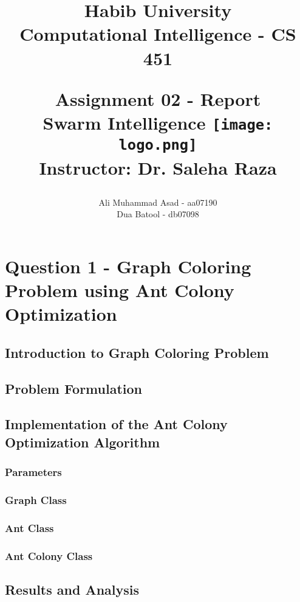 \documentclass{article}
\title{{\huge \textbf{Habib University \\ Computational Intelligence - CS 451}}

\vspace*{5mm}
{\LARGE \textbf{Assignment 02 - Report} \\ \textbf{Swarm Intelligence}}
{\texttt{[image: logo.png]}} \\ 
{\Large \textbf{Instructor:} Dr. Saleha Raza}}
\author{Ali Muhammad Asad - aa07190 \\ Dua Batool - db07098}
\date{}
\theoremstyle{mytheoremstyle}
\theoremstyle{mytheoremstyle}
\theoremstyle{myproblemstyle}
\begin{document}
\maketitle

\newpage
\tableofcontents

\newpage
\section{Question 1 - Graph Coloring Problem using Ant Colony Optimization}
\subsection{Introduction to Graph Coloring Problem}

\subsection{Problem Formulation}

\subsection{Implementation of the Ant Colony Optimization Algorithm}
\subsubsection{Parameters}
\subsubsection{Graph Class}
\subsubsection{Ant Class}
\subsubsection{Ant Colony Class}

\subsection{Results and Analysis}
\end{document}
